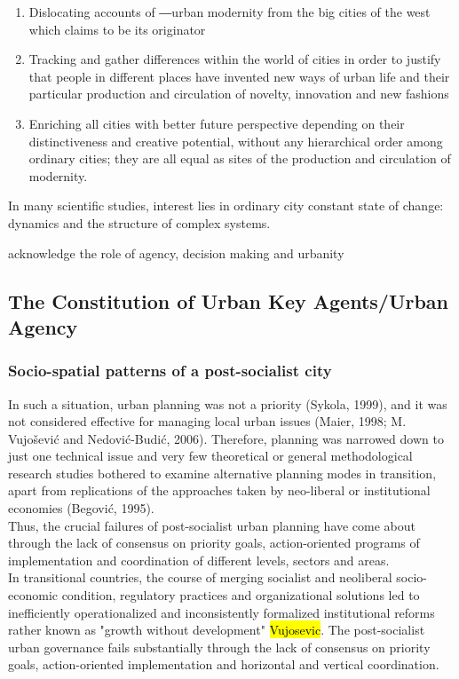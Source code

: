\documentclass[11pt]{report}
\begin{document}
\begin{enumerate}
\item Dislocating accounts of ―urban modernity from the big cities of the west which claims to be its 
originator
\item Tracking  and  gather  differences  within  the  world  of  cities  in  order  to  justify  that  people  in different  places  have  invented  new  ways  of  urban  life  and  their  particular  production  and circulation of novelty, innovation and new fashions
\item Enriching  all  cities  with  better  future  perspective  depending  on  their  distinctiveness  and creative potential, without any hierarchical order among ordinary cities; they are all equal as 
sites of the production and circulation of modernity.
\end{enumerate}
In many scientific studies, interest lies in ordinary city constant state of change: dynamics and the structure of complex systems.

acknowledge the role of agency, decision making and urbanity

\subsection{The Constitution of Urban Key Agents/Urban Agency}


\subsubsection{Socio-spatial patterns of a post-socialist city}
In such a situation, urban planning was not a priority (Sykola, 1999), and it was not considered effective for managing local urban issues (Maier, 1998; M. Vujošević and Nedović-Budić, 2006). Therefore, planning was narrowed down to just one technical issue and very few theoretical or general methodological research studies bothered to examine alternative planning modes in transition, apart from replications of the approaches taken by neo-liberal or institutional economies (Begović, 1995).
\\
Thus, the crucial failures of post-socialist urban planning have come about through the lack of consensus on priority goals, action-oriented programs of implementation and coordination of different levels, sectors and areas. 
\\
In transitional countries, the course of merging socialist and neoliberal socio-economic condition, regulatory practices and organizational solutions led to inefficiently operationalized and inconsistently formalized institutional reforms rather known as "growth without development" \hl{Vujosevic}.
The post-socialist urban governance fails substantially through the lack of consensus on priority goals, action-oriented implementation and horizontal and vertical coordination.
\\
\end{document}
